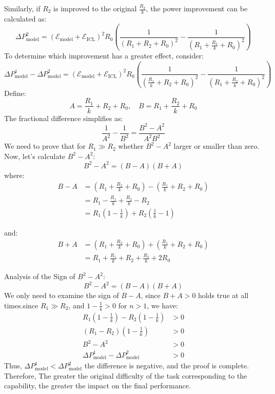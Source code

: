 Similarly, if $R_2$ is improved to the original $\frac{R_2}{k}$, the power improvement can be calculated as:
\begin{equation}
    \Delta P^2_{\text{model}} = \left(\mathcal{E}_{\text{model}} + \mathcal{E}_{\text{ICL}}\right)^2 R_0 (\frac{1}{(R_1+R_2 + R_0)^2}-\frac{1}{(R_1+\frac{R_2}{k} + R_0)^2})
\end{equation}
To determine which improvement has a greater effect, consider:
\begin{equation}
    \Delta P^1_{\text{model}} - \Delta P^2_{\text{model}} = \left(\mathcal{E}_{\text{model}} + \mathcal{E}_{\text{ICL}}\right)^2 R_0 (\frac{1}{(\frac{R_1}{k} +R_2 + R_0)^2}-\frac{1}{(R_1+\frac{R_2}{k} + R_0)^2})
\end{equation}
Define: 
\begin{equation}
A = \frac{R_1}{k} + R_2 + R_0, \quad B = R_1 + \frac{R_2}{k} + R_0
\end{equation}
The fractional difference simplifies as: 
\begin{equation}
\frac{1}{A^2} - \frac{1}{B^2} = \frac{B^2 - A^2}{A^2 B^2}
\end{equation}
We need to prove that for \( R_1 \gg R_2 \) whether $B^2 - A^2 $ larger or smaller than zero. Now, let's calculate \( B^2 - A^2 \):
\begin{equation}
B^2 - A^2 = (B - A)(B + A)
\end{equation}
where: 
\begin{align}
B - A &= \left(R_1 + \frac{R_2}{k} + R_0\right) - \left(\frac{R_1}{k} + R_2 + R_0\right)\\
&= R_1 - \frac{R_1}{k} + \frac{R_2}{k} - R_2\\
&= R_1\left(1 - \frac{1}{k}\right) + R_2\left(\frac{1}{k} - 1\right)
\end{align}

and:
\begin{align}
B + A &= \left(R_1 + \frac{R_2}{k} + R_0\right) + \left(\frac{R_1}{k} + R_2 + R_0\right)\\
&= R_1 + \frac{R_1}{k} + R_2 + \frac{R_2}{k} + 2R_0
\end{align}

Analysis of the Sign of \( B^2 - A^2 \):
\begin{equation}
B^2 - A^2 = (B - A)(B + A)
\end{equation}
We only need to examine the sign of \( B - A \), since \( B + A > 0 \) holds true at all times.since \( R_1 \gg R_2 \), and \( 1 - \frac{1}{k} > 0 \) for \( n > 1 \), we have:
\begin{align}
R_1\left(1 - \frac{1}{k}\right) - R_2\left(1 - \frac{1}{k}\right) &>0\\
(R_1-R_2)\left(1 - \frac{1}{k}\right)&> 0\\
B^2 - A^2 &> 0\\
\Delta P^1_{\text{model}} - \Delta P^2_{\text{model}} &> 0
\end{align}
Thus, $\Delta P^1_{\text{model}} < \Delta P^2_{\text{model}}$ the difference is negative, and the proof is complete. Therefore, The greater the original difficulty of the task corresponding to the capability, the greater the impact on the final performance.